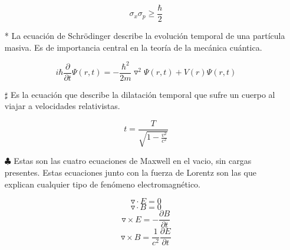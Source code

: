 \documentclass[4apaper, 12pt]{article}
\begin{document}
\begin{itemize}
    $$\sigma_x \sigma_p\geq \frac{\hbar}{2} $$
    
   \item [*] La ecuación de Schrödinger describe la evolución temporal de una partícula masiva. Es de importancia central en la teoría de la mecánica cuántica.
    
    \begin{equation*}
        i\hbar\frac{\partial}{\partial t}\varPsi(r,t)=-\frac{\hbar^2}{2m}\triangledown^2\varPsi(r,t)+V(r)\varPsi(r,t)
    \end{equation*}
    
   \item[$\sharp$] Es la ecuación que describe la dilatación temporal que sufre un cuerpo al viajar a velocidades relativistas.
    
    \[t=\frac{T}{\sqrt{1-\frac{v^2}{c^2}}}\]
    
    \item[$\clubsuit$] Estas son las cuatro ecuaciones de Maxwell en el vacio, sin cargas presentes. Estas ecuaciones junto con la fuerza de Lorentz son las que explican cualquier tipo de fenómeno electromagnético.
    
    $$\triangledown\cdot E=0$$
    $$\triangledown\cdot B=0$$
    $$\triangledown\times E=-\frac{\partial B}{\partial t}$$
    $$\triangledown\times B=\frac{1}{c^2}\frac{\partial E}{\partial t}$$
    

\end{itemize}
\end{document}
